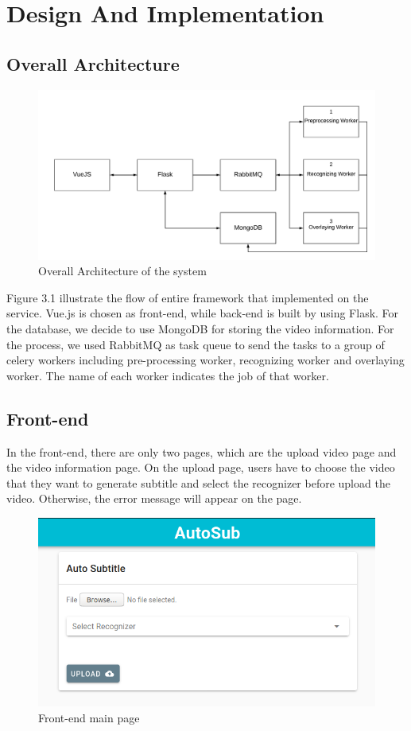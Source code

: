 \documentclass[natbib]{muthesis}
\begin{document}
 \chapter{Design And Implementation}
 \section{Overall Architecture}
 
 \begin{figure}[H]
 	\centering
 	\captionsetup{justification=centering}
 	\includegraphics[width=1.0\linewidth]{images/overall-architecture}
 	\caption{Overall Architecture of the system}
 	\label{fig:overall-architecture}
 \end{figure}
 
 Figure 3.1 illustrate the flow of entire framework that implemented on the service. Vue.js is chosen as front-end, while back-end is built by using Flask. For the database, we decide to use MongoDB for storing the video information. For the process, we used RabbitMQ as task queue to send the tasks to a group of celery workers including pre-processing worker, recognizing worker and overlaying worker. The name of each worker indicates the job of that worker.
 
 \section{Front-end}
 In the front-end, there are only two pages, which are the upload video page and the video information page.
 On the upload page, users have to choose the video that they want to generate subtitle and select the recognizer before upload the video. Otherwise, the error message will appear on the page.
 \begin{figure}[H]
	\centering
	\captionsetup{justification=centering}
	\includegraphics[width=0.8\linewidth]{images/main}
	\caption{Front-end main page}
	\label{fig:frontend-main}
 \end{figure}
\end{document}
